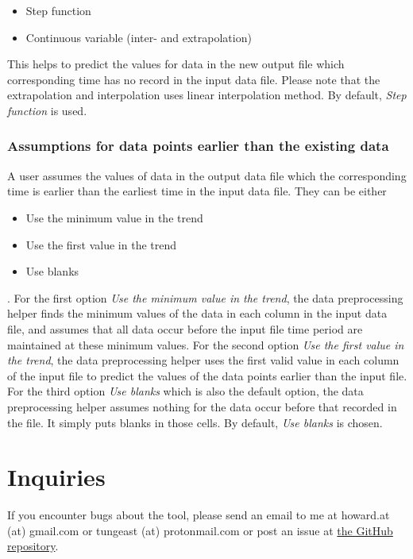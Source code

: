 \documentclass[12pt,a4paper]{article}
\begin{document}
\begin{itemize}
\item Step function
\item Continuous variable (inter- and extrapolation)
\end{itemize}

This helps to predict the values for data in the new output file which corresponding time has no record in the input data file.
Please note that the extrapolation and interpolation uses linear interpolation method.
By default, \emph{Step function} is used.

\subsubsection{Assumptions for data points earlier than the existing data}
\label{subsec:early_dat}
A user assumes the values of data in the output data file which the corresponding time is earlier than the earliest time in the input data file. They can be either

\begin{itemize}
\item Use the minimum value in the trend
\item Use the first value in the trend
\item Use blanks
\end{itemize}

.
For the first option \emph{Use the minimum value in the trend}, the data preprocessing helper finds the minimum values of the data in each column in the input data file, and assumes that all data occur before the input file time period are maintained at these minimum values.
For the second option \emph{Use the first value in the trend}, the data preprocessing helper uses the first valid value in each column of the input file to predict the values of the data points earlier than the input file.
For the third option \emph{Use blanks} which is also the default option, the data preprocessing helper assumes nothing for the data occur before that recorded in the file.
It simply puts blanks in those cells.
By default, \emph{Use blanks} is chosen.

\section{Inquiries}

If you encounter bugs about the tool, please send an email to me at howard.at (at) gmail.com or tungeast (at) protonmail.com or post an issue at \href{https://github.com/howardcheung/data-preprocessing-helper/}{the GitHub repository}.
\end{document}

